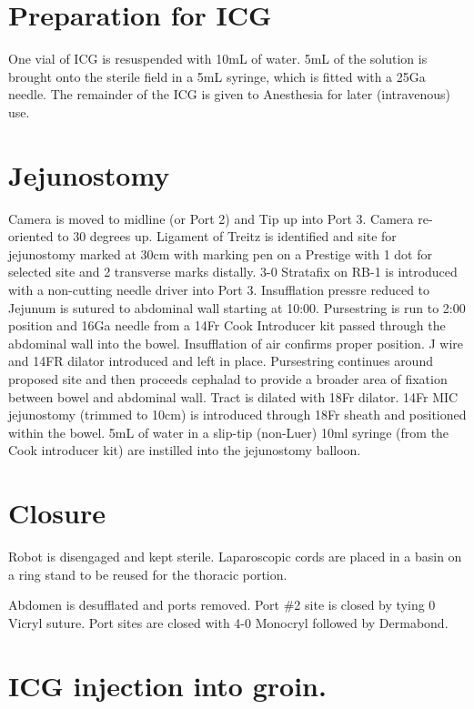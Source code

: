 \documentclass[
  letterpaper,
]{scrbook}
\begin{document}
\section{Preparation for ICG}\label{preparation-for-icg}

One vial of ICG is resuspended with 10mL of water. 5mL of the solution
is brought onto the sterile field in a 5mL syringe, which is fitted with
a 25Ga needle. The remainder of the ICG is given to Anesthesia for later
(intravenous) use.

\section{Jejunostomy}\label{jejunostomy}

Camera is moved to midline (or Port 2) and Tip up into Port 3. Camera
re-oriented to 30 degrees up. Ligament of Treitz is identified and site
for jejunostomy marked at 30cm with marking pen on a Prestige with 1 dot
for selected site and 2 transverse marks distally. 3-0 Stratafix on RB-1
is introduced with a non-cutting needle driver into Port 3. Insufflation
pressre reduced to Jejunum is sutured to abdominal wall starting at
10:00. Pursestring is run to 2:00 position and 16Ga needle from a 14Fr
Cook Introducer kit passed through the abdominal wall into the bowel.
Insufflation of air confirms proper position. J wire and 14FR dilator
introduced and left in place. Pursestring continues around proposed site
and then proceeds cephalad to provide a broader area of fixation between
bowel and abdominal wall. Tract is dilated with 18Fr dilator. 14Fr MIC
jejunostomy (trimmed to 10cm) is introduced through 18Fr sheath and
positioned within the bowel. 5mL of water in a slip-tip (non-Luer) 10ml
syringe (from the Cook introducer kit) are instilled into the
jejunostomy balloon.

\section{Closure}\label{closure}

Robot is disengaged and kept sterile. Laparoscopic cords are placed in a
basin on a ring stand to be reused for the thoracic portion.

Abdomen is desufflated and ports removed. Port \#2 site is closed by
tying 0 Vicryl suture. Port sites are closed with 4-0 Monocryl followed
by Dermabond.

\section{ICG injection into groin.}\label{icg-injection-into-groin.}
\end{document}
